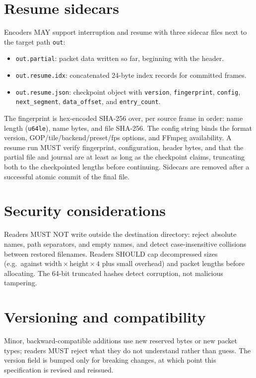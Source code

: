 \documentclass[11pt,a4paper]{article}
\begin{document}
\section{Resume sidecars}

Encoders MAY support interruption and resume with three sidecar files next to
the target path \texttt{out}:

\begin{itemize}
\item \texttt{out.partial}: packet data written so far, beginning with the
header.
\item \texttt{out.resume.idx}: concatenated 24-byte index records for
committed frames.
\item \texttt{out.resume.json}: checkpoint object with \texttt{version},
\texttt{fingerprint}, \texttt{config}, \texttt{next\_segment},
\texttt{data\_offset}, and \texttt{entry\_count}.
\end{itemize}

The fingerprint is hex-encoded SHA-256 over, per source frame in order: name
length (\texttt{u64le}), name bytes, and file SHA-256. The config string binds
the format version, GOP/tile/backend/preset/fps options, and FFmpeg
availability. A resume run MUST verify fingerprint, configuration, header
bytes, and that the partial file and journal are at least as long as the
checkpoint claims, truncating both to the checkpointed lengths before
continuing. Sidecars are removed after a successful atomic commit of the final
file.

\section{Security considerations}
\label{sec:security}

Readers MUST NOT write outside the destination directory: reject absolute
names, path separators, and empty names, and detect case-insensitive
collisions between restored filenames. Readers SHOULD cap decompressed sizes
(e.g.\ against $\text{width} \times \text{height} \times 4$ plus small
overhead) and packet lengths before allocating. The 64-bit truncated hashes
detect corruption, not malicious tampering.

\section{Versioning and compatibility}

Minor, backward-compatible additions use new reserved bytes or new packet
types; readers MUST reject what they do not understand rather than guess. The
version field is bumped only for breaking changes, at which point this
specification is revised and reissued.
\end{document}
